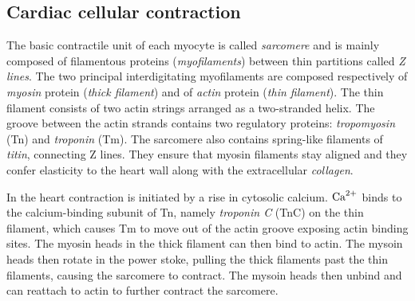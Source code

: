 

%
%
%
\subsection{Cardiac cellular contraction}\label{sec:cardiaccellcontr}
The basic contractile unit of each myocyte is called \textit{sarcomere} and is mainly composed of filamentous proteins (\textit{myofilaments}) between thin partitions called \textit{Z lines}. The two principal interdigitating myofilaments are composed respectively of \textit{myosin} protein (\textit{thick filament}) and of \textit{actin} protein (\textit{thin filament}). The thin filament consists of two actin strings arranged as a two-stranded helix. The groove between the actin strands contains two regulatory proteins: \textit{tropomyosin} (\acs{Tn}) and \textit{troponin} (\acs{Tm}). The sarcomere also contains spring-like filaments of \textit{titin}, connecting Z lines. They ensure that myosin filaments stay aligned and they confer elasticity to the heart wall along with the extracellular \textit{collagen}. 

\vspace{0.2cm}
In the heart contraction is initiated by a rise in cytosolic calcium. $\textrm{Ca}^{2+}$ binds to the calcium-binding subunit of Tn, namely \textit{troponin C} (\acs{TnC}) on the thin filament, which causes Tm to move out of the actin groove exposing actin binding sites. The myosin heads in the thick filament can then bind to actin. The mysoin heads then rotate in the power stoke, pulling the thick filaments past the thin filaments, causing the sarcomere to contract. The mysoin heads then unbind and can reattach to actin to further contract the sarcomere. 


